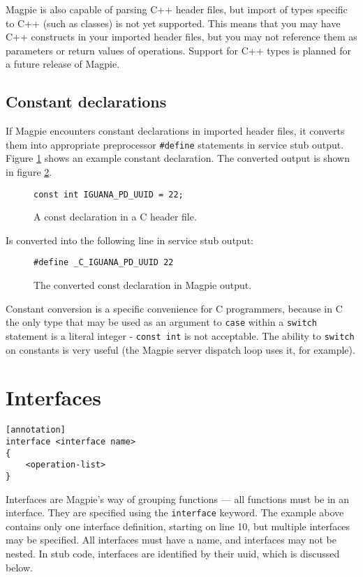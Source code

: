 Magpie is also capable of parsing C++ header files, but import of types specific to C++ (such as classes) is not yet supported. This means that you may have C++ constructs in your imported header files, but you may not reference them as parameters or return values of operations. Support for C++ types is planned for a future release of Magpie.

\subsection{Constant declarations}
If Magpie encounters constant declarations in imported header files, it converts them into appropriate preprocessor {\tt \#define} statements in service stub output. Figure \ref{figure.constdecl.c} shows an example constant declaration. The converted output is shown in figure \ref{figure.constdecl.magpie}.
\begin{figure}
\begin{verbatim}
const int IGUANA_PD_UUID = 22;
\end{verbatim}
\caption{A const declaration in a C header file.}
\label{figure.constdecl.c}
\end{figure}
Is converted into the following line in service stub output:
\begin{figure}
\begin{verbatim}
#define _C_IGUANA_PD_UUID 22
\end{verbatim}
\caption{The converted const declaration in Magpie output.}
\label{figure.constdecl.magpie}
\end{figure}
Constant conversion is a specific convenience for C programmers, because in C the only type that may be used as an argument to {\tt case} within a {\tt switch} statement is a literal integer - {\tt const int} is not acceptable. The ability to {\tt switch} on constants is very useful (the Magpie server dispatch loop uses it, for example).

\section{Interfaces}
\begin{verbatim}
[annotation]
interface <interface name>
{
    <operation-list>
}
\end{verbatim}
Interfaces are Magpie's way of grouping functions --- all functions must be in an interface. They are specified using the {\tt interface} keyword. The example above contains only one interface definition, starting on line 10, but multiple interfaces may be specified. All interfaces must have a name, and interfaces may not be nested. In stub code, interfaces are identified by their uuid, which is discussed below.

